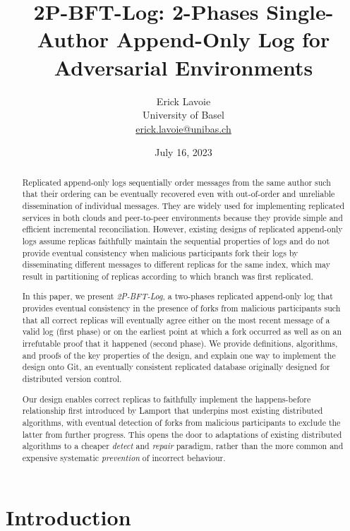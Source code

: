 \documentclass[9pt, oneside]{article}   	%
\title{2P-BFT-Log: 2-Phases Single-Author Append-Only Log for Adversarial Environments}
\author{Erick Lavoie \\
University of Basel \\
\href{mailto:erick.lavoie@unibas.ch}{erick.lavoie@unibas.ch}}
\date{July 16, 2023}							%
\begin{document}
\maketitle


\begin{abstract}
Replicated append-only logs sequentially order messages from the same author such that their ordering can be eventually recovered even with out-of-order and unreliable dissemination of individual messages. They are widely used for implementing replicated services in both clouds and peer-to-peer environments because they provide simple and efficient incremental reconciliation. However, existing designs of replicated append-only logs assume replicas faithfully maintain the sequential properties of logs and do not provide eventual consistency when malicious participants fork their logs by disseminating different messages to different replicas for the same index, which may result in partitioning of replicas according to which branch was first replicated.
 
In this paper, we present \textit{2P-BFT-Log}, a two-phases replicated append-only log that provides eventual consistency in the presence of forks from malicious participants such that all correct replicas will eventually agree either on the most recent message of a valid log (first phase) or on the earliest point at which a fork occurred as well as on an irrefutable proof that it happened (second phase). We provide definitions, algorithms, and proofs of the key properties of the design, and explain one way to implement the design onto Git, an eventually consistent replicated database originally designed for distributed version control.

Our design enables correct replicas to faithfully implement the happens-before relationship first introduced by Lamport that underpins most existing distributed algorithms, with eventual detection of forks from malicious participants to exclude the latter from further progress. This opens the door to adaptations of existing distributed algorithms to a cheaper \textit{detect} and \textit{repair} paradigm, rather than the more common and expensive systematic \textit{prevention} of incorrect behaviour.
\end{abstract}

\section{Introduction}
\label{sec:introduction}
\end{document}
